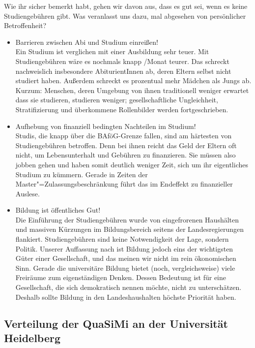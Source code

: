 Wie ihr sicher bemerkt habt, gehen wir davon aus, dass es gut sei, wenn es
keine Studiengebühren gibt. Was veranlasst uns dazu, mal abgesehen von
persönlicher Betroffenheit?
\begin{itemize}
\item {Barrieren zwischen Abi und Studium einreißen!}\\Ein Studium ist
    verglichen mit einer Ausbildung sehr teuer. Mit Studiengebühren wäre es
    nochmals knapp /Monat teurer. Das schreckt nachweislich insbesondere
    AbiturientInnen ab, deren Eltern selbst nicht studiert haben. Außerdem schreckt
    es prozentual mehr Mädchen als Jungs ab. Kurzum: Menschen, deren Umgebung von
    ihnen traditionell weniger erwartet dass sie studieren, studieren weniger;
    gesellschaftliche Ungleichheit, Stratifizierung und überkommene Rollenbilder
    werden fortgeschrieben.
\item {Aufhebung von finanziell bedingten Nachteilen im Studium!}\\Studis, die
    knapp über die BAföG-Grenze fallen, sind am härtesten von Studiengebühren
    betroffen. Denn bei ihnen reicht das Geld der Eltern oft nicht, um
    Lebensunterhalt und Gebühren zu finanzieren. Sie müssen also jobben gehen und
    haben somit deutlich weniger Zeit, sich um ihr eigentliches Studium zu kümmern.
    Gerade in Zeiten der Master"=Zulassungsbeschränkung führt das im Endeffekt zu
    finanzieller Auslese.
\item {Bildung ist öffentliches Gut!}\\Die Einführung der Studiengebühren wurde
    von eingefrorenen Haushälten und massiven Kürzungen im Bildungsbereich seitens
    der Landesregierungen flankiert. Studiengebühren sind keine Notwendigkeit der
    Lage, sondern Politik. Unserer Auffassung nach ist Bildung jedoch eins der
    wichtigsten Güter einer Gesellschaft, und das meinen wir nicht im rein
    ökonomischen Sinn. Gerade die universitäre Bildung bietet (noch,
    vergleichsweise) viele Freiräume zum eigenständigen Denken. Dessen Bedeutung
    ist für eine Gesellschaft, die sich demokratisch nennen möchte, nicht zu
    unterschätzen. Deshalb sollte Bildung in den Landeshaushalten höchste Priorität
    haben.
\end{itemize}

\subsection*{Verteilung der QuaSiMi an der Universität Heidelberg}

